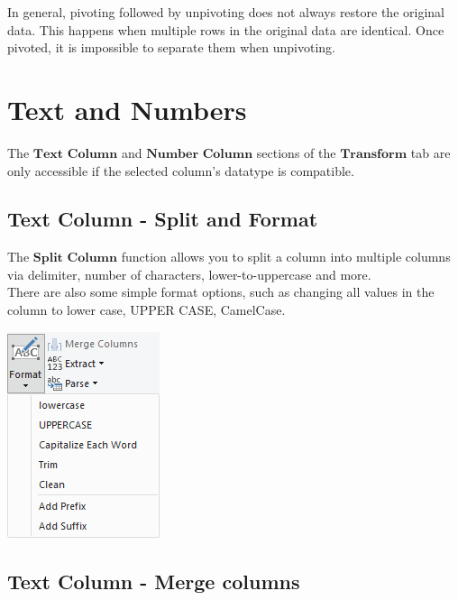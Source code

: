 \documentclass[10pt, openany, twocolumn]{book}
\begin{document}
\begin{tcolorbox}[colback=yellow!2!white, colframe=yellow!60!gray]
In general, pivoting followed by unpivoting does not always restore the original data. This happens when multiple rows in the original data are identical. Once pivoted, it is impossible to separate them when unpivoting.
\end{tcolorbox}

\section{Text and Numbers}

The $\textbf{Text Column}$ and $\textbf{Number Column}$ sections of the $\textbf{Transform}$ tab are only accessible if the selected column's datatype is compatible.

\subsection*{Text Column - Split and Format}

The $\textbf{Split Column}$ function allows you to split a column into multiple columns via delimiter, number of characters, lower-to-uppercase and more. \\
There are also some simple format options, such as changing all values in the column to lower case, UPPER CASE, CamelCase.
\begin{center}
    \includegraphics[width = 0.45\columnwidth]{images/TextColumn.png}
\end{center}

\subsection*{Text Column - Merge columns}
\end{document}
